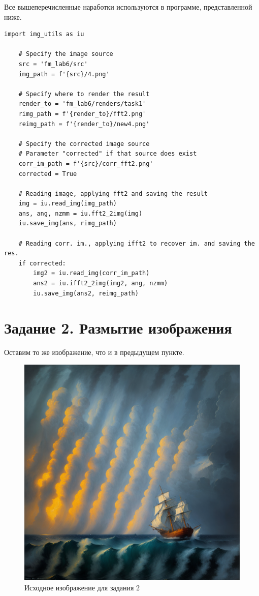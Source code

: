 \documentclass[a4paper, 12pt]{article}
\begin{document}
    Все вышеперечисленные наработки используются в программе, представленной ниже.
    \begin{lstlisting}[label=task11, caption={Реализация задания 1}]
    import img_utils as iu

    # Specify the image source
    src = 'fm_lab6/src'
    img_path = f'{src}/4.png'

    # Specify where to render the result
    render_to = 'fm_lab6/renders/task1'
    rimg_path = f'{render_to}/fft2.png'
    reimg_path = f'{render_to}/new4.png'

    # Specify the corrected image source
    # Parameter "corrected" if that source does exist
    corr_im_path = f'{src}/corr_fft2.png'
    corrected = True

    # Reading image, applying fft2 and saving the result
    img = iu.read_img(img_path)
    ans, ang, nzmm = iu.fft2_2img(img)
    iu.save_img(ans, rimg_path)

    # Reading corr. im., applying ifft2 to recover im. and saving the res.
    if corrected:
        img2 = iu.read_img(corr_im_path)
        ans2 = iu.ifft2_2img(img2, ang, nzmm)
        iu.save_img(ans2, reimg_path)
    \end{lstlisting}


    \section{Задание 2. Размытие изображения}
    Оставим то же изображение, что и в предыдущем пункте.
    \begin{figure}[H]
        \centering
        \includegraphics[width=0.45\linewidth]{4.png}
        \captionsetup{skip=0pt}
        \caption{Исходное изображение для задания 2}
        \label{fig:4dotpng2}
    \end{figure}
    
\end{document}

